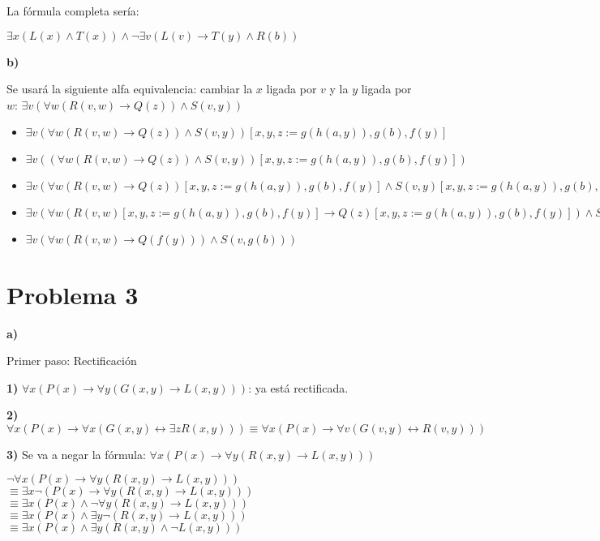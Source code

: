 \documentclass{article}
\begin{document}
La fórmula completa sería:

$\exists x (L(x) \land T(x)) \land \lnot \exists v (L(v) \rightarrow T(y) \land R(b))$

\textbf{b)}


Se usará la siguiente alfa equivalencia: cambiar la $x$ ligada por $v$ y la $y$ ligada por $w$: $\exists v (\forall w (R(v, w) \rightarrow Q(z)) \land S(v, y))$

\begin{itemize}
\item $\exists v (\forall w (R(v, w) \rightarrow Q(z)) \land S(v, y)) [x, y, z := g(h(a, y)), g(b), f(y)]$
\item $\exists v ( (\forall w (R(v, w) \rightarrow Q(z)) \land S(v, y)) [x, y, z := g(h(a, y)), g(b), f(y)] )$
\item $\exists v ( \forall w (R(v, w) \rightarrow Q(z)) [x, y, z := g(h(a, y)), g(b), f(y)] \land S(v, y) [x, y, z := g(h(a, y)), g(b), f(y)] )$
\item $\exists v ( \forall w (R(v, w) [x, y, z := g(h(a, y)), g(b), f(y)] \rightarrow Q(z) [x, y, z := g(h(a, y)), g(b), f(y)]) \land S(v, g(b)) )$
\item $\exists v ( \forall w (R(v, w) \rightarrow Q(f(y))) \land S(v, g(b)) )$
\end{itemize}

\section*{Problema 3}

\textbf{a)}

Primer paso: Rectificación


\textbf{1)} $\forall x (P(x) \rightarrow \forall y (G(x, y) \rightarrow L(x, y)))$: ya está rectificada.


\textbf{2)} $\forall x (P(x) \rightarrow \forall x (G(x, y) \leftrightarrow \exists z R(x, y))) \equiv \forall x (P(x) \rightarrow \forall v (G(v, y) \leftrightarrow R(v, y)))$


\textbf{3)} Se va a negar la fórmula: $\forall x (P(x) \rightarrow \forall y (R(x, y) \rightarrow L(x, y)))$

$\lnot \forall x (P(x) \rightarrow \forall y (R(x, y) \rightarrow L(x, y)))$\\
$\equiv \exists x \lnot (P(x) \rightarrow \forall y (R(x, y) \rightarrow L(x, y)))$\\
$\equiv \exists x (P(x) \land \lnot \forall y (R(x, y) \rightarrow L(x, y)))$\\
$\equiv \exists x (P(x) \land \exists y \lnot (R(x, y) \rightarrow L(x, y)))$\\
$\equiv \exists x (P(x) \land \exists y (R(x, y) \land \lnot L(x, y)))$
\end{document}
